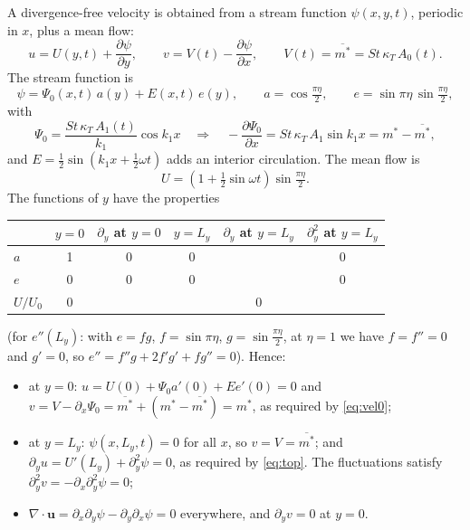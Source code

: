 \documentclass[11pt,a4paper]{article}
\newcommand{\pd}[2]{\frac{\partial #1}{\partial #2}}
\begin{document}
A divergence-free velocity is obtained from a stream function $\psi(x,y,t)$, periodic in $x$, plus a
mean flow:
\begin{equation}
  u = U(y,t) + \pd{\psi}{y}, \qquad v = V(t) - \pd{\psi}{x}, \qquad V(t) = \overline{m^*} = St\,\kappa_T\,A_0(t).
\end{equation}
The stream function is
\begin{equation}
  \psi = \Psi_0(x,t)\,a(y) + E(x,t)\,e(y), \qquad
  a = \cos\tfrac{\pi\eta}{2}, \qquad e = \sin\pi\eta\,\sin\tfrac{\pi\eta}{2},
\end{equation}
with
\begin{equation}
  \Psi_0 = \frac{St\,\kappa_T\,A_1(t)}{k_1}\cos k_1 x \quad\Rightarrow\quad
  -\pd{\Psi_0}{x} = St\,\kappa_T\,A_1\sin k_1 x = m^* - \overline{m^*},
\end{equation}
and $E = \tfrac12\sin\!\left(k_1x+\tfrac12\omega t\right)$ adds an interior circulation. The mean flow is
\begin{equation}
  U = \left(1+\tfrac12\sin\omega t\right)\sin\tfrac{\pi\eta}{2}.
\end{equation}
The functions of $y$ have the properties
\begin{center}
\begin{tabular}{lccccc}
\toprule
 & $y=0$ & $\partial_y$ at $y=0$ & $y=L_y$ & $\partial_y$ at $y=L_y$ & $\partial_y^2$ at $y=L_y$ \\
\midrule
$a$ & 1 & 0 & 0 & & 0 \\
$e$ & 0 & 0 & 0 & & 0 \\
$U/U_0$ & 0 & & & 0 & \\
\bottomrule
\end{tabular}
\end{center}
(for $e''(L_y)$: with $e=fg$, $f=\sin\pi\eta$, $g=\sin\frac{\pi\eta}2$, at $\eta=1$ we have $f=f''=0$ and
$g'=0$, so $e''=f''g+2f'g'+fg''=0$). Hence:
\begin{itemize}
  \item at $y=0$: $u = U(0) + \Psi_0 a'(0) + E e'(0) = 0$ and
        $v = V - \partial_x\Psi_0 = \overline{m^*} + (m^*-\overline{m^*}) = m^*$, as required by \eqref{eq:vel0};
  \item at $y=L_y$: $\psi(x,L_y,t)=0$ for all $x$, so $v=V=\overline{m^*}$; and
        $\partial_y u = U'(L_y) + \partial_y^2\psi = 0$, as required by \eqref{eq:top}. The fluctuations
        satisfy $\partial_y^2 v = -\partial_x\partial_y^2\psi = 0$;
  \item $\nabla\cdot\mathbf u = \partial_x\partial_y\psi - \partial_y\partial_x\psi = 0$ everywhere, and
        $\partial_y v = 0$ at $y=0$.
\end{itemize}
\end{document}
